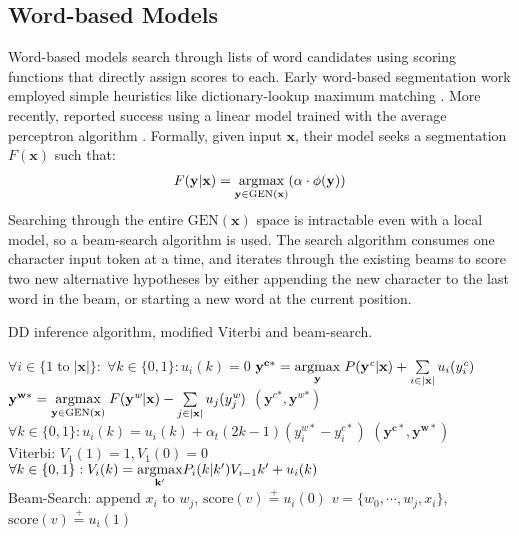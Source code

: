\subsection{Word-based Models}
Word-based models search through lists of word candidates using scoring functions that directly assign scores to each. 
Early word-based segmentation work employed simple heuristics like dictionary-lookup maximum matching \cite{Chen:1992:ACL}. 
More recently,  reported success using a linear model trained with the average perceptron algorithm \cite{Collins:2002:EMNLP}.
 Formally, given input $\mathbf{x}$, their model seeks a segmentation $F(\mathbf{x})$ such that:
\begin{align*}
F(\mathbf{y}|\mathbf{x}) =  \underset{\mathbf{y} \in \mathrm{GEN}(\mathbf{x})}{\operatorname{argmax}}{ \left( \alpha \cdot \phi(\mathbf{\mathbf{y}}) \right) }
\end{align*}
\noindent Searching through the entire $\mathrm{GEN}(\mathbf{x})$ space is intractable even with a local model, so a beam-search algorithm is used. The search algorithm consumes one character input token at a time, and iterates through the existing beams to score two new alternative hypotheses by either appending the new character to the last word in the beam, or starting a new word at the current position.

\begin{algorithm}[!ht]
\begin{footnotesize}
\caption{DD inference algorithm, modified Viterbi and beam-search.}
\begin{algorithmic}
\STATE $\forall i \in \{1\; \mathrm{to} \; |\mathbf{x}|\} \colon \; \forall k \in \{0,1\} \colon u_{i}(k) = 0$
\STATE   $\mathbf{y^{c*}} = \underset{\mathbf{y}}{\operatorname{argmax}} \; P(\mathbf{y^\textit{c}} | \mathbf{x}) +  \sum\limits_{i\in |\mathbf{x}|}{u_{i}(y_i^\textit{c})}$ 
\STATE   $\mathbf{y^{w*}} = \underset{\mathbf{y} \in \mathrm{GEN}(\mathbf{x})}{\operatorname{argmax}} \; F(\mathbf{y^\textit{w}} | \mathbf{x}) -  \sum\limits_{j\in |\mathbf{x}|}{ u_{j}(y_j^\textit{w})}$
\RETURN $\left(\mathbf{y^{\textit{c}*}},\mathbf{y^{\textit{w}*}}\right)$
\ENDIF
{}
\STATE  $\forall k \in \{0,1\}: u_i(k)=u_i(k) + \alpha_t (2k-1)(y_i^{w*}-y_i^{c*})$ 
\ENDFOR
\ENDFOR
\RETURN $\left(\mathbf{y^{c*}},\mathbf{y^{w*}}\right)$
 \\\hrulefill
\STATE Viterbi: 
\STATE $V_1(1) = 1, V_1(0) = 0$
\STATE $\forall k \in \{0,1\}: V_i(k) = \underset{\mathbf{k'}}{\operatorname{argmax}} P_i(k | k') V_{i-1}{k'} + u_{i}(k)$ 
\ENDFOR
 \\\hrulefill
\STATE Beam-Search:
\STATE append $x_i$ to $w_j$, $\mathrm{score}(v) \stackrel{+}{=}   u_{i}(0)$
\STATE $v = \{w_0,\cdots,w_j, x_i\}$, $\mathrm{score}(v) \stackrel{+}{=} u_{i}(1)$
\ENDFOR
\ENDFOR
\end{algorithmic}
\label{algo:DD}
\end{footnotesize}
\end{algorithm}


